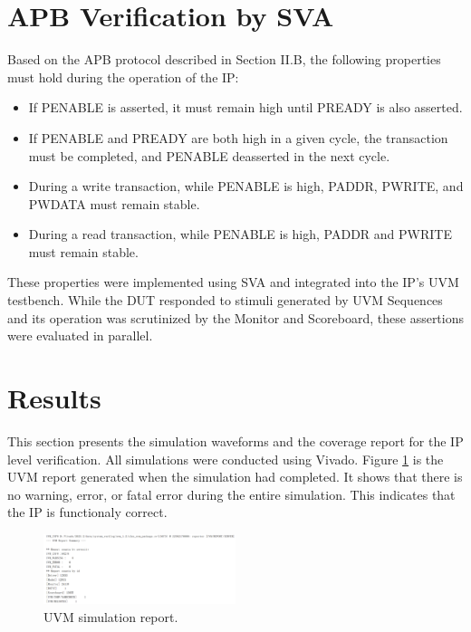 \documentclass[conference]{IEEEtran}
\begin{document}
\section{APB Verification by SVA}
Based on the APB protocol described in Section II.B, the following properties must hold during the operation of the IP:

\begin{itemize}
    \item If PENABLE is asserted, it must remain high until PREADY is also asserted.
    \item If PENABLE and PREADY are both high in a given cycle, the transaction must be completed, and PENABLE deasserted in the next cycle.
    \item During a write transaction, while PENABLE is high, PADDR, PWRITE, and PWDATA must remain stable.
    \item During a read transaction, while PENABLE is high, PADDR and PWRITE must remain stable.
\end{itemize}

These properties were implemented using SVA and integrated into the IP's UVM testbench. While the DUT responded to stimuli generated by UVM Sequences and its operation was scrutinized by the Monitor and Scoreboard, these assertions were evaluated in parallel.


\section{Results}
This section presents the simulation waveforms and the coverage report for the IP level verification. All simulations were conducted using Vivado. Figure \ref{fig:report} is the UVM report generated when the simulation had completed. It shows that there is no warning, error, or fatal error during the entire simulation. This indicates that the IP is functionaly correct.

\begin{figure}[h!]
    \centering
    \includegraphics[width = 0.5\textwidth]{figures/report.png}
    \caption{UVM simulation report.}
    \label{fig:report}
\end{figure}
\end{document}
